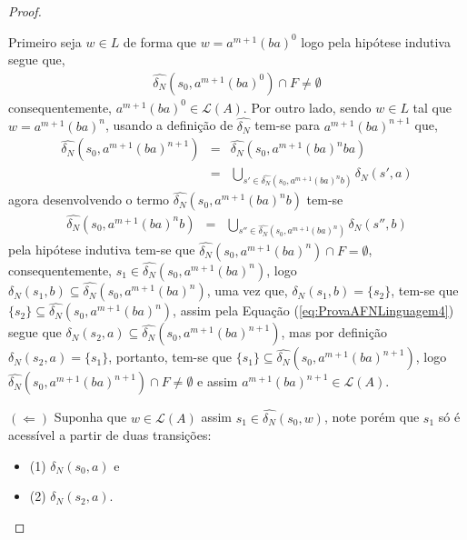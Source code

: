 \begin{exem}
\begin{proof}
\begin{itemize}
			Primeiro seja $w \in L$ de forma que $w = a^{m+1}(ba)^0$ logo pela hipótese indutiva segue que, 
			\begin{eqnarray*}
				\widehat{\delta_N}(s_0, a^{m+1}(ba)^0) \cap F \neq \emptyset
			\end{eqnarray*}
			consequentemente, $a^{m+1}(ba)^0 \in \mathcal{L}(A)$. Por outro lado, sendo $w \in L$ tal que $w = a^{m+1}(ba)^n$, usando a  definição de $\widehat{\delta_N}$ tem-se para $a^{m+1}(ba)^{n+1}$ que, 
			\begin{eqnarray}\label{eq:ProvaAFNLinguagem4}
				\widehat{\delta_N}(s_0, a^{m+1}(ba)^{n+1}) & = & \widehat{\delta_N}(s_0, a^{m+1}(ba)^{n}ba)\nonumber\\
				& = & \bigcup_{s' \in \widehat{\delta_N}(s_0, a^{m+1}(ba)^{n}b)} \delta_N(s', a)
			\end{eqnarray}
			agora desenvolvendo o termo $\widehat{\delta_N}(s_0, a^{m+1}(ba)^{n}b)$ tem-se
			\begin{eqnarray*}
				\widehat{\delta_N}(s_0, a^{m+1}(ba)^{n}b) & = & \bigcup_{s'' \in \widehat{\delta_N}(s_0, a^{m+1}(ba)^{n})} \delta_N(s'', b)
			\end{eqnarray*}
			pela hipótese indutiva tem-se que $\widehat{\delta_N}(s_0, a^{m+1}(ba)^{n}) \cap F = \emptyset$, consequentemente, $s_1 \in \widehat{\delta_N}(s_0, a^{m+1}(ba)^{n})$, logo $\delta_N(s_1, b) \subseteq \widehat{\delta_N}(s_0, a^{m+1}(ba)^{n})$, uma vez que, $\delta_N(s_1, b) = \{s_2\}$, tem-se que $\{s_2\} \subseteq \widehat{\delta_N}(s_0, a^{m+1}(ba)^{n})$, assim pela Equação (\ref{eq:ProvaAFNLinguagem4}) segue que $\delta_N(s_2, a) \subseteq \widehat{\delta_N}(s_0, a^{m+1}(ba)^{n+1})$, mas por definição $\delta_N(s_2, a) = \{s_1\}$, portanto, tem-se que $\{s_1\} \subseteq \widehat{\delta_N}(s_0, a^{m+1}(ba)^{n+1})$, logo $\widehat{\delta_N}(s_0, a^{m+1}(ba)^{n+1}) \cap F \neq \emptyset$ e assim $a^{m+1}(ba)^{n+1} \in \mathcal{L}(A)$.
		\end{itemize}
		$(\Leftarrow)$ Suponha que $w \in \mathcal{L}(A)$ assim $s_1 \in \widehat{\delta_N}(s_0, w)$, note porém que $s_1$ só é acessível a partir de duas transições: 
		\begin{itemize}
			\item (1) $\delta_N(s_0, a)$ e
			\item (2) $\delta_N(s_2, a)$. 
		\end{itemize}

\end{proof}
\end{exem}
